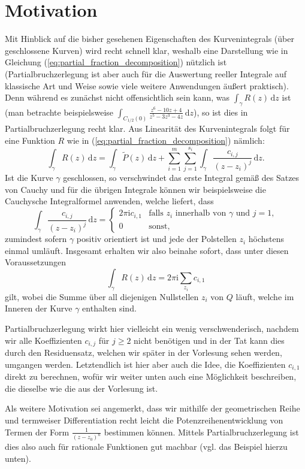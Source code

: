 \documentclass{article}
\theoremstyle{plain}
\theoremstyle{definition}
\newcommand{\iu}{\mathrm{i}}
\begin{document}
\section{Motivation}
Mit Hinblick auf die bisher gesehenen Eigenschaften des Kurvenintegrals (über geschlossene Kurven) wird recht schnell klar, weshalb eine Darstellung wie in Gleichung (\ref{eq:partial_fraction_decomposition}) nützlich ist (Partialbruchzerlegung ist aber auch für die Auswertung reeller Integrale auf \glqq klassische\grqq{} Art und Weise sowie viele weitere Anwendungen äußert praktisch).
Denn während es zunächst nicht offensichtlich sein kann, was $\int_{\gamma} R(z) \,\mathrm{d}z$ ist (man betrachte beispielsweise $\int_{C_{1/2}(0)} \frac{z^6-10z+4}{z^5 - 3 z^3 - 4 z} \,\mathrm{d}z$), so ist dies in Partialbruchzerlegung recht klar.
Aus Linearität des Kurvenintegrals folgt für eine Funktion $R$ wie in (\ref{eq:partial_fraction_decomposition}) nämlich:
\[
	\int_{\gamma} R(z) \,\mathrm{d}z = \int_{\gamma} \tilde{P}(z) \,\mathrm{d}z + \sum_{i=1}^{m} \sum_{j=1}^{s_i} \int_{\gamma} \frac{c_{i,j}}{(z - z_i)^j} \,\mathrm{d}z.
\]
Ist die Kurve $\gamma$ geschlossen, so verschwindet das erste Integral gemäß des Satzes von Cauchy und für die übrigen Integrale können wir beispielsweise die Cauchysche Integralformel anwenden, welche liefert, dass
\[
	\int_{\gamma} \frac{c_{i, j}}{(z - z_i)^j} \,\mathrm{d}z = \begin{cases} 2 \pi \iu c_{i,1} & \text{falls } z_i \text{ innerhalb von $\gamma$ und } j = 1, \\ 0 & \text{sonst,} \end{cases}
\]
zumindest sofern $\gamma$ positiv orientiert ist und jede der Polstellen $z_i$ höchstens einmal umläuft.
Insgesamt erhalten wir also beinahe sofort, dass unter diesen Voraussetzungen
\[
	\int_{\gamma} R(z) \,\mathrm{d}z = 2 \pi \iu \sum_{z_i} c_{i, 1}
\]
gilt, wobei die Summe über all diejenigen Nullstellen $z_i$ von $Q$ läuft, welche im Inneren der Kurve $\gamma$ enthalten sind.

Partialbruchzerlegung wirkt hier vielleicht ein wenig \glqq verschwenderisch\grqq{}, nachdem wir alle Koeffizienten $c_{i, j}$ für $j \ge 2$ nicht benötigen und in der Tat kann dies durch den Residuensatz, welchen wir später in der Vorlesung sehen werden, umgangen werden.
Letztendlich ist hier aber auch die Idee, die Koeffizienten $c_{i, 1}$ direkt zu berechnen, wofür wir weiter unten auch eine Möglichkeit beschreiben, die dieselbe wie die aus der Vorlesung ist.

Als weitere Motivation sei angemerkt, dass wir mithilfe der geometrischen Reihe und termweiser Differentiation recht leicht die Potenzreihenentwicklung von Termen der Form $\frac{1}{(z - z_0)^n}$ bestimmen können.
Mittels Partialbruchzerlegung ist dies also auch für rationale Funktionen gut machbar (vgl. das Beispiel hierzu unten).
\end{document}
